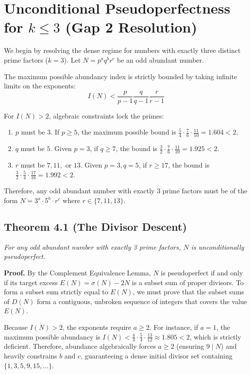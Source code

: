 \documentclass{erdos_paper}
\begin{document}
\section{Unconditional Pseudoperfectness for $k \le 3$ (Gap 2 Resolution)}

We begin by resolving the dense regime for numbers with exactly three distinct prime factors ($k=3$). Let $N = p^a q^b r^c$ be an odd abundant number. 

The maximum possible abundancy index is strictly bounded by taking infinite limits on the exponents:
$$ I(N) < \frac{p}{p-1} \frac{q}{q-1} \frac{r}{r-1} $$

For $I(N) > 2$, algebraic constraints lock the primes:
\begin{enumerate}
    \item $p$ must be $3$. If $p \ge 5$, the maximum possible bound is $\frac{5}{4} \cdot \frac{7}{6} \cdot \frac{11}{10} = 1.604 < 2$.
    \item $q$ must be $5$. Given $p=3$, if $q \ge 7$, the bound is $\frac{3}{2} \cdot \frac{7}{6} \cdot \frac{11}{10} = 1.925 < 2$.
    \item $r$ must be $7, 11,$ or $13$. Given $p=3, q=5$, if $r \ge 17$, the bound is $\frac{3}{2} \cdot \frac{5}{4} \cdot \frac{17}{16} = 1.992 < 2$.
\end{enumerate}
Therefore, any odd abundant number with exactly 3 prime factors must be of the form $N = 3^a \cdot 5^b \cdot r^c$ where $r \in \{7, 11, 13\}$.

\subsection{Theorem 4.1 (The Divisor Descent)}
\textit{For any odd abundant number with exactly 3 prime factors, $N$ is unconditionally pseudoperfect.}

\textbf{Proof.} By the Complement Equivalence Lemma, $N$ is pseudoperfect if and only if its target excess $E(N) = \sigma(N) - 2N$ is a subset sum of proper divisors. To form a subset sum strictly equal to $E(N)$, we must prove that the subset sums of $D(N)$ form a contiguous, unbroken sequence of integers that covers the value $E(N)$.

Because $I(N) > 2$, the exponents require $a \ge 2$. For instance, if $a=1$, the maximum possible abundancy is $I(N) < \frac{4}{3} \cdot \frac{5}{4} \cdot \frac{13}{12} \approx 1.805 < 2$, which is strictly deficient. Therefore, abundance algebraically forces $a \ge 2$ (ensuring $9 \mid N$) and heavily constrains $b$ and $c$, guaranteeing a dense initial divisor set containing $\{1, 3, 5, 9, 15, \dots\}$.
\end{document}
